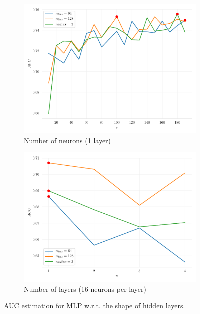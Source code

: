 \begin{figure}[h]
    \begin{subfigure}{0.49\textwidth}
        \centering
        \includegraphics[width=\textwidth]{resources/pdf/mlp-layer-size.pdf}
        \caption{Number of neurons (1 layer)}
    \end{subfigure}
    \begin{subfigure}{0.49\textwidth}
        \centering
        \includegraphics[width=\textwidth]{resources/pdf/mlp-layer-number.pdf}
        \caption{Number of layers (16 neurons per layer)}
    \end{subfigure}
    \caption{AUC estimation for MLP w.r.t. the shape of hidden layers.}
    \label{fig:mlp}
\end{figure}

